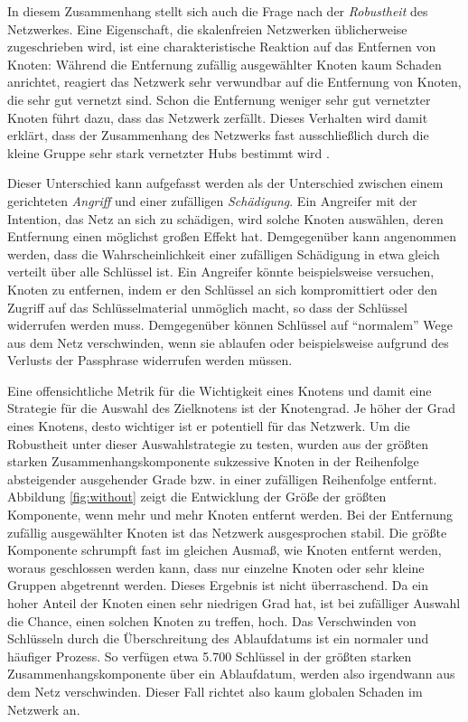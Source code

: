 In diesem Zusammenhang stellt sich auch die Frage nach der
\emph{Robustheit} des Netzwerkes.  Eine Eigenschaft, die skalenfreien
Netzwerken üblicherweise zugeschrieben wird, ist eine
charakteristische Reaktion auf das Entfernen von Knoten: Während die
Entfernung zufällig ausgewählter Knoten kaum Schaden anrichtet,
reagiert das Netzwerk sehr verwundbar auf die Entfernung von Knoten,
die sehr gut vernetzt sind. Schon die Entfernung weniger sehr gut
vernetzter Knoten führt dazu, dass das Netzwerk
zerfällt. Dieses Verhalten wird damit erkl\"art, dass der Zusammenhang des
Netzwerks fast ausschlie{\ss}lich durch die kleine Gruppe sehr stark
vernetzter Hubs bestimmt wird \cite{Albert2000}.

Dieser Unterschied kann aufgefasst werden als der Unterschied zwischen
einem gerichteten \emph{Angriff} und einer zufälligen
\emph{Schädigung}. Ein Angreifer mit der Intention, das Netz an sich
zu schädigen, wird solche Knoten auswählen, deren Entfernung einen
möglichst großen Effekt hat. Demgegenüber kann angenommen werden,
dass die Wahrscheinlichkeit einer zufälligen Schädigung in etwa
gleich verteilt über alle Schlüssel ist. Ein Angreifer könnte
beispielsweise versuchen, Knoten zu entfernen, indem er den
Schlüssel an sich kompromittiert oder den Zugriff auf das
Schlüsselmaterial unmöglich macht, so dass der Schlüssel
widerrufen werden muss. Demgegenüber können Schlüssel auf
``normalem'' Wege aus dem Netz verschwinden, wenn sie ablaufen oder
beispielsweise aufgrund des Verlusts der Passphrase widerrufen werden
müssen.

Eine offensichtliche Metrik für die Wichtigkeit eines Knotens und
damit eine Strategie für die Auswahl des Zielknotens ist der
Knotengrad. Je höher der Grad eines Knotens, desto wichtiger ist er
potentiell für das Netzwerk. Um die Robustheit unter dieser
Auswahlstrategie zu testen, wurden aus der größten starken
Zusammenhangskomponente sukzessive Knoten in der Reihenfolge
absteigender ausgehender Grade bzw. in einer zufälligen Reihenfolge
entfernt. Abbildung \ref{fig:without} zeigt die Entwicklung der Größe
der größten Komponente, wenn mehr und mehr Knoten entfernt werden. Bei
der Entfernung zufällig ausgewählter Knoten ist das Netzwerk
ausgesprochen stabil. Die größte Komponente schrumpft fast im gleichen
Ausma{\ss}, wie Knoten entfernt werden, woraus geschlossen werden kann,
dass nur einzelne Knoten oder sehr kleine Gruppen abgetrennt werden. Dieses Ergebnis ist nicht
überraschend. Da ein hoher Anteil der Knoten einen sehr niedrigen Grad
hat, ist bei zufälliger Auswahl die Chance, einen solchen Knoten zu
treffen, hoch. Das Verschwinden von Schlüsseln durch die
\"Uberschreitung des Ablaufdatums ist ein
normaler und häufiger Prozess. So verfügen etwa 5.700 Schlüssel in der
größten starken Zusammenhangskomponente über ein Ablaufdatum, werden
also irgendwann aus dem Netz verschwinden. Dieser Fall richtet also
kaum globalen Schaden im Netzwerk an.

